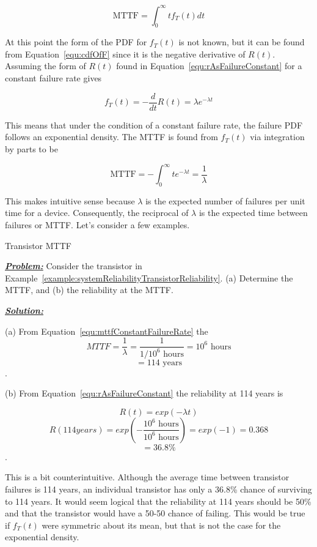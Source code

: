 {\begin{equation}
\label{equ:mttfIntegral}
\text{MTTF} = \int^\infty_0 t f_T(t) dt 
\end{equation}

At this point the form of the PDF for $f_T(t)$ is not known, but it can be
found from Equation~\ref{equ:cdfOfF} since it is the negative derivative 
of $R(t)$. Assuming the form of $R(t)$ found in 
Equation~\ref{equ:rAsFailureConstant} for a constant failure rate gives

\begin{equation}
\label{equ:mttfConstantFailureRate}
f_T(t) = -\frac{d}{dt}R(t) = \lambda e^{-\lambda t}
\end{equation}

This means that under the condition of a constant failure rate, the
failure PDF follows an exponential density. The MTTF is found from
$f_T(t)$ via integration by parts to be

\begin{equation}
\label{equ:mttfConstantFailureRate}
\text{MTTF} = -\int^\infty_0 t e^{-\lambda t} = \frac{1}{\lambda}
\end{equation}

This makes intuitive sense because $\lambda$ is the expected number of
failures per unit time for a device. Consequently, the reciprocal of
$\lambda$ is the expected time between failures or MTTF. Let's consider a
few examples.

\begin{example}{Transistor MTTF}
\label{example:systemReliabilityMttf}

\emph{\textbf{\ul{Problem:}}} Consider the transistor in 
Example~\ref{example:systemReliabilityTransistorReliability}.
(a) Determine the MTTF, and (b) the reliability at the MTTF.

\emph{\textbf{\ul{Solution:}}}

(a) From Equation~\ref{equ:mttfConstantFailureRate} the 
$$MTTF =\frac{1}{\lambda} = \frac{1}{1/10^6 \text{ hours}} = 10^6 \text{ hours} $$
$$		= 114 \text{ years} $$.

(b) From Equation~\ref{equ:rAsFailureConstant} the reliability at 114 years is

$$R(t) = exp(-\lambda t) $$
$$	R(114 years) = exp( -\frac{10^6 \text{ hours}}{10^6 \text{ hours}} ) = exp(-1) = 0.368 $$
$$	= 36.8\%$$.
\end{example}

This is a bit counterintuitive. Although the average time between
transistor failures is 114 years, an individual transistor has only a
36.8\% chance of surviving to 114 years. It would seem logical that the
reliability at 114 years should be 50\% and that the transistor would
have a 50-50 chance of failing. This would be true if $f_T(t)$
were symmetric about its mean,
but that is not the case for the exponential density.

}
